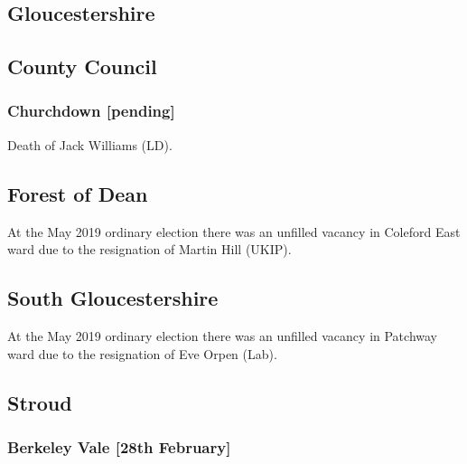\documentclass[a4paper,openany]{book}
\begin{document}
\begin{resultsiii}
\section{Gloucestershire}

\subsection*{County Council}

\subsubsection*{Churchdown \hspace*{\fill}\nolinebreak[1]%
	\enspace\hspace*{\fill}
	[pending]}


Death of Jack Williams (LD).

\subsection*{Forest of Dean}

At the May 2019 ordinary election there was an unfilled vacancy in Coleford East ward due to the resignation of Martin Hill (UKIP).

\subsection*{South Gloucestershire}

At the May 2019 ordinary election there was an unfilled vacancy in Patchway ward due to the resignation of Eve Orpen (Lab).

\subsection*{Stroud}

\subsubsection*{Berkeley Vale \hspace*{\fill}\nolinebreak[1]%
	\enspace\hspace*{\fill}
	[28th February]}


\end{resultsiii}
\end{document}
